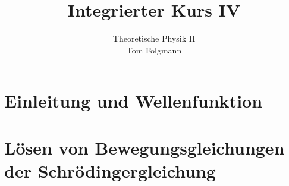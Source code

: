 \documentclass{article}
\title{Integrierter Kurs IV}
\author{Theoretische Physik II\\Tom Folgmann}
\begin{document}
    \maketitle
    \noindent{}
    \tableofcontents

    \section{Einleitung und Wellenfunktion}
        
        
        
        
        
        
        
        
        
    \section{Lösen von Bewegungsgleichungen der Schrödingergleichung}
        

    \newpage
    
\end{document}
